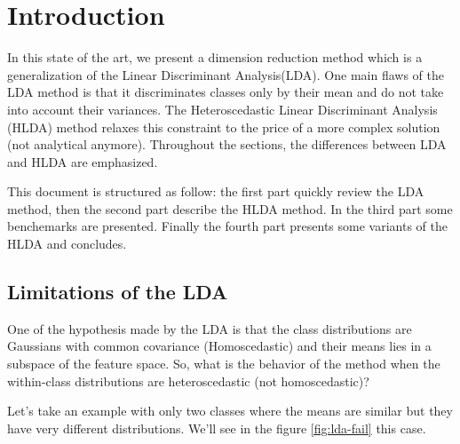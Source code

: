 
\section{Introduction}
\label{sec:introduction}

In this state of the art, we present a dimension reduction method
which is a generalization of the Linear Discriminant Analysis(LDA).
One main flaws of the LDA method
is that it discriminates classes only by their mean and do not take into
account their variances. The Heteroscedastic Linear Discriminant Analysis (HLDA)
method relaxes this constraint to the price of a more complex solution
(not analytical anymore). Throughout the sections, the differences between LDA and
HLDA are emphasized.

This document is structured as follow: the first part quickly review the LDA method,
then the second part describe the HLDA method. In the third part some benchemarks
are presented. Finally the fourth part presents some variants of the HLDA and concludes.

\subsection{Limitations of the LDA}
\label{sec:limitations-lda}

One of the hypothesis made by the LDA is that the class distributions
are Gaussians with common covariance (Homoscedastic) and their means
lies in a subspace of the feature space. So, what is the behavior of
the method when the within-class distributions are heteroscedastic
(not homoscedastic)?

Let's take an example with only two classes where the means are
similar but they have very different distributions. We'll see in the
figure \ref{fig:lda-fail} this case.

